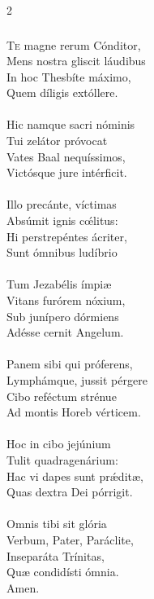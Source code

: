 \documentclass[9pt,twoside]{extarticle}
\begin{document}
\begin{multicols}{2}
\subsubsection*{\center {}}
\lettrine{T}e magne rerum Cónditor,\\
Mens nostra gliscit láudibus\\
In hoc Thesbíte máximo,\\
Quem díligis extóllere.\\
\\
Hic namque sacri nóminis\\
Tui zelátor próvocat\\
Vates Baal nequíssimos,\\
Victósque jure intérficit.\\
\\
Illo precánte, víctimas\\
Absúmit ignis cœ́litus:\\
Hi perstrepéntes ácriter,\\
Sunt ómnibus ludíbrio\\
\\
Tum Jezabélis ímpiæ\\
Vitans furórem nóxium,\\
Sub junípero dórmiens \\
Adésse cernit Angelum.\\
\\
Panem sibi qui próferens,\\
Lymphámque, jussit pérgere\\
Cibo reféctum strénue\\
Ad montis Horeb vérticem.\\
\\
Hoc in cibo jejúnium\\
Tulit quadragenárium:\\
Hac vi dapes sunt prǽditæ,\\
Quas dextra Dei pórrigit.\\
\\
Omnis tibi sit glória\\
Verbum, Pater, Paráclite,\\
Inseparáta Trínitas,\\
Quæ condidísti ómnia.\\
Amen.


\end{multicols}
\end{document}
